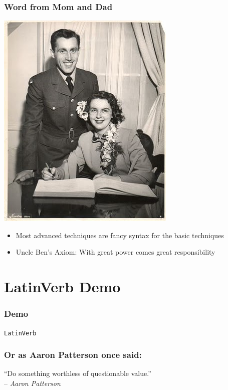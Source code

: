 \documentclass[slidestop,compress,mathserif]{beamer}
\begin{document}
\begin{frame}
	\frametitle{Word from Mom and Dad}
	\begin{center}
		\includegraphics[scale=0.35]{img/MomDadMarried50s.jpeg}
	\end{center}
	\pause
	\begin{itemize}
		\item Most advanced techniques are fancy syntax for the basic techniques
		\pause
		\item Uncle Ben's Axiom:  With great power comes great responsibility
	\end{itemize}	
\end{frame}

\section{LatinVerb Demo} %
\label{sub:_modeling_thought_in_latinverb}

\begin{frame}
	\frametitle{Demo}
	\begin{center}
		\texttt{LatinVerb}
	\end{center}
\end{frame}

\begin{frame}
	\frametitle{Or as Aaron Patterson once said:}
	\begin{center}
		``Do something worthless of questionable value.'' \\ -- \emph{Aaron Patterson}
	\end{center}
\end{frame}
\end{document}
